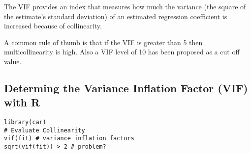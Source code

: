 \documentclass[a4paper,12pt]{article}
\begin{document}
The VIF provides an index that measures how much the variance (the square of the estimate's standard deviation) of an estimated regression coefficient is increased because of collinearity.


A common rule of thumb is that if the VIF is greater than 5 then multicollinearity is high. Also a VIF level of 10 has been proposed as a cut off value.

\newpage
\subsection{Determing the Variance Inflation Factor (VIF) with R}
\begin{verbatim}
library(car)
# Evaluate Collinearity
vif(fit) # variance inflation factors
sqrt(vif(fit)) > 2 # problem?
\end{verbatim}
%
%


%
%
%
%
%
\end{document}
